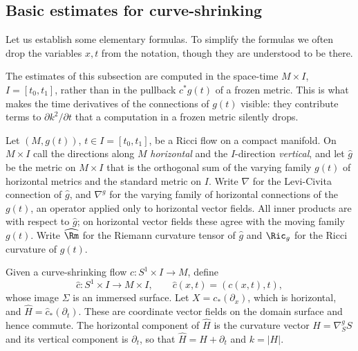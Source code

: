 \subsection{Basic estimates for curve-shrinking}

Let us establish some elementary formulas. To simplify the formulas we often
drop the variables $x,t$ from the notation, though they are understood to be
there.

The estimates of this subsection are computed in the space-time
$M\times I$, $I=[t_0,t_1]$, rather than in the pullback $c^*g(t)$ of a frozen
metric. This is what makes the time derivatives of the connections of $g(t)$
visible: they contribute terms to $\partial k^2/\partial t$ that a computation
in a frozen metric silently drops.

\begin{notation}
\label{not:curve-shrinking-spacetime}
\label{spacetimehat}
Let $(M,g(t))$, $t\in I=[t_0,t_1]$, be a Ricci flow on a compact manifold. On
$M\times I$ call the directions along $M$ \emph{horizontal} and the
$I$-direction \emph{vertical}, and let $\hat g$ be the metric on $M\times I$
that is the orthogonal sum of the varying family $g(t)$ of horizontal metrics
and the standard metric on $I$. Write $\nabla$ for the Levi-Civita connection
of $\hat g$, and $\nabla^g$ for the varying family of horizontal connections of
the $g(t)$, an operator applied only to horizontal vector fields. All inner
products are with respect to $\hat g$; on horizontal vector fields these agree
with the moving family $g(t)$. Write $\widehat{\Rm}$ for the Riemann curvature
tensor of $\hat g$ and $\Ric_g$ for the Ricci curvature of $g(t)$.

Given a curve-shrinking flow $c\colon S^1\times I\to M$, define
$$\hat c\colon S^1\times I\to M\times I,\qquad \hat c(x,t)=(c(x,t),t),$$
whose image $\Sigma$ is an immersed surface. Let $X=c_*(\partial_x)$, which is
horizontal, and $\widehat H=\hat c_*(\partial_t)$. These are coordinate vector
fields on the domain surface and hence commute. The horizontal component of
$\widehat H$ is the curvature vector $H=\nabla^g_SS$ and its vertical component
is $\partial_t$, so that $\widehat H=H+\partial_t$ and $k=|H|$.
\end{notation}

